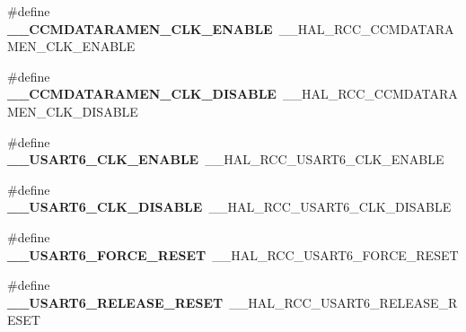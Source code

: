 \begin{DoxyCompactItemize}
\item 
\hypertarget{group___h_a_l___r_c_c___aliased_gaa16691622e4f4f03061ab0c5778934dd}{\#define {\bfseries \-\_\-\-\_\-\-C\-C\-M\-D\-A\-T\-A\-R\-A\-M\-E\-N\-\_\-\-C\-L\-K\-\_\-\-E\-N\-A\-B\-L\-E}~\-\_\-\-\_\-\-H\-A\-L\-\_\-\-R\-C\-C\-\_\-\-C\-C\-M\-D\-A\-T\-A\-R\-A\-M\-E\-N\-\_\-\-C\-L\-K\-\_\-\-E\-N\-A\-B\-L\-E}\label{group___h_a_l___r_c_c___aliased_gaa16691622e4f4f03061ab0c5778934dd}

\item 
\hypertarget{group___h_a_l___r_c_c___aliased_ga25851169ddbfc457b597cfacc91173bd}{\#define {\bfseries \-\_\-\-\_\-\-C\-C\-M\-D\-A\-T\-A\-R\-A\-M\-E\-N\-\_\-\-C\-L\-K\-\_\-\-D\-I\-S\-A\-B\-L\-E}~\-\_\-\-\_\-\-H\-A\-L\-\_\-\-R\-C\-C\-\_\-\-C\-C\-M\-D\-A\-T\-A\-R\-A\-M\-E\-N\-\_\-\-C\-L\-K\-\_\-\-D\-I\-S\-A\-B\-L\-E}\label{group___h_a_l___r_c_c___aliased_ga25851169ddbfc457b597cfacc91173bd}

\item 
\hypertarget{group___h_a_l___r_c_c___aliased_ga2dfc83c494279808ed47f7842f0a40e6}{\#define {\bfseries \-\_\-\-\_\-\-U\-S\-A\-R\-T6\-\_\-\-C\-L\-K\-\_\-\-E\-N\-A\-B\-L\-E}~\-\_\-\-\_\-\-H\-A\-L\-\_\-\-R\-C\-C\-\_\-\-U\-S\-A\-R\-T6\-\_\-\-C\-L\-K\-\_\-\-E\-N\-A\-B\-L\-E}\label{group___h_a_l___r_c_c___aliased_ga2dfc83c494279808ed47f7842f0a40e6}

\item 
\hypertarget{group___h_a_l___r_c_c___aliased_ga0b5f454318d65779b4fcb8f415181852}{\#define {\bfseries \-\_\-\-\_\-\-U\-S\-A\-R\-T6\-\_\-\-C\-L\-K\-\_\-\-D\-I\-S\-A\-B\-L\-E}~\-\_\-\-\_\-\-H\-A\-L\-\_\-\-R\-C\-C\-\_\-\-U\-S\-A\-R\-T6\-\_\-\-C\-L\-K\-\_\-\-D\-I\-S\-A\-B\-L\-E}\label{group___h_a_l___r_c_c___aliased_ga0b5f454318d65779b4fcb8f415181852}

\item 
\hypertarget{group___h_a_l___r_c_c___aliased_ga1a9db7963c878ef6018ff9bbc439e8ca}{\#define {\bfseries \-\_\-\-\_\-\-U\-S\-A\-R\-T6\-\_\-\-F\-O\-R\-C\-E\-\_\-\-R\-E\-S\-E\-T}~\-\_\-\-\_\-\-H\-A\-L\-\_\-\-R\-C\-C\-\_\-\-U\-S\-A\-R\-T6\-\_\-\-F\-O\-R\-C\-E\-\_\-\-R\-E\-S\-E\-T}\label{group___h_a_l___r_c_c___aliased_ga1a9db7963c878ef6018ff9bbc439e8ca}

\item 
\hypertarget{group___h_a_l___r_c_c___aliased_ga78937fd5dc3a98a2aea8b54a276ab49a}{\#define {\bfseries \-\_\-\-\_\-\-U\-S\-A\-R\-T6\-\_\-\-R\-E\-L\-E\-A\-S\-E\-\_\-\-R\-E\-S\-E\-T}~\-\_\-\-\_\-\-H\-A\-L\-\_\-\-R\-C\-C\-\_\-\-U\-S\-A\-R\-T6\-\_\-\-R\-E\-L\-E\-A\-S\-E\-\_\-\-R\-E\-S\-E\-T}\label{group___h_a_l___r_c_c___aliased_ga78937fd5dc3a98a2aea8b54a276ab49a}


\end{DoxyCompactItemize}
